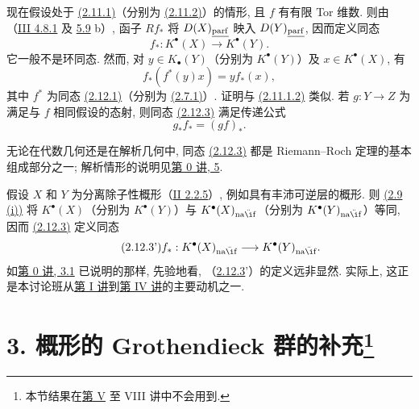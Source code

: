 现在假设处于 \hyperlink{sga6.e04.para.2-11-1}{(2.11.1)}（分别为 \hyperlink{sga6.e04.para.2-11-2}{(2.11.2)}）的情形, 且 \(f\) 有有限 Tor 维数. 则由（\hyperlink{sga6.e03.cor.4-8-1}{III 4.8.1} 及 \hyperlink{sga6.e03.rem.5-8}{5.9} b）, 函子 \(Rf_*\) 将 \(D(X)_{\underline{\operatorname{parf}}}\) 映入 \(D(Y)_{\underline{\operatorname{parf}}}\), 因而定义同态
\begin{equation}\tag{2.12.3}
 f_*:K^{\bullet}(X)\longrightarrow K^{\bullet}(Y).
\end{equation}
它一般不是环同态. 然而, 对 \(y\in K_{\bullet}(Y)\)（分别为 \(K^{\bullet}(Y)\)）及 \(x\in K^{\bullet}(X)\), 有
\begin{equation}\tag{2.12.4}
 f_*(f^*(y)x)=y f_*(x),
\end{equation}
其中 \(f^*\) 为同态 \hyperlink{sga6.e04.eq.2-12-1}{(2.12.1)}（分别为 \hyperlink{sga6.e04.eq.2-7-1}{(2.7.1)}）. 证明与 \hyperlink{sga6.e04.eq.2-11-1-2}{(2.11.1.2)} 类似. 若 \(g:Y\to Z\) 为满足与 \(f\) 相同假设的态射, 则同态 \hyperlink{sga6.e04.eq.2-12-3}{(2.12.3)} 满足传递公式
\begin{equation}\tag{2.12.3.1}
 g_*f_*=(gf)_*.
\end{equation}

无论在代数几何还是在解析几何中, 同态 \hyperlink{sga6.e04.eq.2-12-3}{(2.12.3)} 都是 Riemann--Roch 定理的基本组成部分之一; 解析情形的说明见\hyperlink{sga6.e00.sec.5}{第 0 讲, 5}.

假设 \(X\) 和 \(Y\) 为分离除子性概形（\hyperlink{sga6.e02.def.2-2-5}{II 2.2.5}）, 例如具有丰沛可逆层的概形. 则 \hyperlink{sga6.e04.para.2-9}{(2.9 (i))} 将 \(K^{\bullet}(X)\)（分别为 \(K^{\bullet}(Y)\)）与 \(K^{\bullet}(X)_{\naif}\)（分别为 \(K^{\bullet}(Y)_{\naif}\)）等同, 因而 \hyperlink{sga6.e04.eq.2-12-3}{(2.12.3)} 定义同态
\begin{equation}\tag{2.12.3'}
 f_*:K^{\bullet}(X)_{\naif}\longrightarrow K^{\bullet}(Y)_{\naif}.
\end{equation}
如\hyperlink{sga6.e00.sec.3.1}{第 0 讲, 3.1} 已说明的那样, 先验地看, （\hyperlink{sga6.e04.eq.2-12-3}{2.12.3}'）的定义远非显然. 实际上, 这正是本讨论班从\hyperlink{sga6.e01.expose}{第 I 讲}到\hyperlink{sga6.e04.expose}{第 IV 讲}的主要动机之一.

\section*{3. 概形的 Grothendieck 群的补充\footnote{本节结果在\hyperlink{sga6.e05.expose}{第 V} 至 VIII 讲中不会用到.}}

